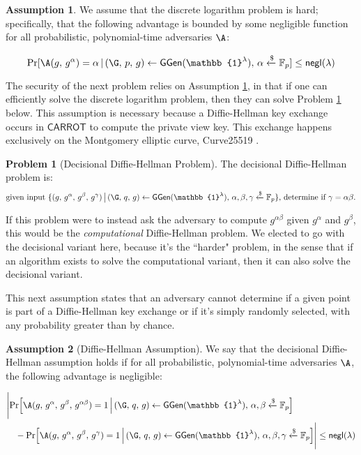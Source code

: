 \documentclass{article}
\theoremstyle{definition}
\newtheorem{problem}{Problem}
\newtheorem{assumption}{Assumption}
\newcommand{\Fp}{\mathbb{F}_p}
\newcommand{\6}{\mathbf}
\newcommand{\7}{\mathcal}
\newcommand{\lar}{\leftarrow}
\newcommand{\lsamp}{\xleftarrow{\$}}
\newcommand{\one}{\mathbb{1}}
\renewcommand{\sf}[1]{{\mathsf{#1}}}
\newcommand{\carr}{$\sf{CARROT}$ }
\begin{document}
\begin{assumption}\label{ass:DLP}
    We assume that the discrete logarithm problem is hard; specifically, that the following advantage is bounded by some negligible function for all probabilistic, polynomial-time adversaries $\A$:
    
    $$ \text{Pr}[\A (g, \, g^{\alpha}) = \alpha \, | \, (\G, \, p, \, g) \lar \mathsf{GGen}(\one^\lambda), \, \alpha \lsamp \Fp] \leq \mathsf{negl}(\lambda)$$
\end{assumption}



\medskip

The security of the next problem relies on Assumption \ref{ass:DLP}, in that if one can efficiently solve the discrete logarithm problem, then they can solve Problem \ref{prob:DHP} below. This assumption is necessary because a Diffie-Hellman key exchange occurs in \carr to compute the private view key. This exchange happens exclusively on the Montgomery elliptic curve, Curve25519 \cite{Montgomery}. 



\begin{problem}[Decisional Diffie-Hellman Problem]\label{prob:DHP}
    The decisional Diffie-Hellman problem is:
    $$\text{given input } \{(g, \, g^{\alpha}, \, g^{\beta}, \, g^{\gamma}) \, \big| \, (\G, \, q, \, g) \lar \mathsf{GGen}(\one^\lambda), \, \alpha, \beta, \gamma \lsamp \Fp\}  \text{, determine if } \gamma = \alpha\beta.$$ 
\end{problem}

If this problem were to instead ask the adversary to compute $g^{\alpha\beta}$ given $g^{\alpha}$ and $ g^{\beta}$, this would be the \textit{computational} Diffie-Hellman problem. We elected to go with the decisional variant here, because it's the ``harder" problem, in the sense that if an algorithm exists to solve the computational variant, then it can also solve the decisional variant.

\medskip

This next assumption states that an adversary cannot determine if a given point is part of a Diffie-Hellman key exchange or if it's simply randomly selected, with any probability greater than by chance.

\begin{assumption}[Diffie-Hellman Assumption]\label{ass:DHA}
    We say that the decisional Diffie-Hellman assumption holds if for all probabilistic, polynomial-time adversaries $\A$, the following advantage is negligible: 

\begin{align*}
    & \Biggl|\text{Pr}\Bigl[\A (g, \, g^{\alpha}, \, g^{\beta}, \, g^{\alpha\beta}) = 1 \, \Big| \, (\G, \, q, \, g) \lar \mathsf{GGen}(\one^\lambda), \, \alpha, \beta \lsamp \Fp \Bigr] \\
    &\quad- \text{Pr}\Bigl[\A (g, \, g^{\alpha}, \, g^{\beta}, \, g^{\gamma}) = 1 \, \Big| \, (\G, \, q, \, g) \lar \mathsf{GGen}(\one^\lambda), \, \alpha, \beta, \gamma \lsamp \Fp\Bigr] \Biggr| \leq \mathsf{negl}(\lambda)
\end{align*}
\end{assumption}
\medskip 
\end{document}
